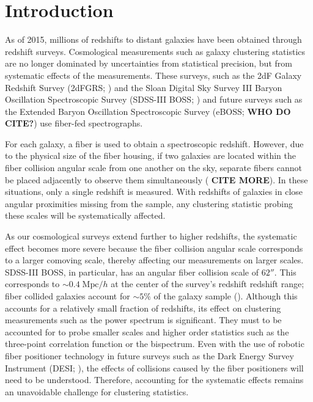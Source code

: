 \documentclass{emulateapj}
\begin{document}
\section{Introduction} 
As of 2015, millions of redshifts to distant galaxies have been obtained through redshift surveys. Cosmological measurements such as galaxy clustering statistics are no longer dominated by uncertainties from statistical precision, but from systematic effects of the measurements. These surveys, such as the 2dF Galaxy Redshift Survey (2dFGRS; \citealt{Colless:1999aa}) and the Sloan Digital Sky Survey III Baryon Oscillation Spectroscopic Survey (SDSS-III BOSS; \citealt{Anderson:2012aa, Dawson:2013aa}) and future surveys such as the Extended Baryon Oscillation Spectroscopic Survey (eBOSS; {\bf WHO DO CITE?}) use fiber-fed spectrographs. 

For each galaxy, a fiber is used to obtain a spectroscopic redshift. However, due to the physical size of the fiber housing, if two galaxies are located within the fiber collision angular scale from one another on the sky, separate fibers cannot be placed adjacently to observe them simultaneously (\citealt{Yoon:2008aa} {\bf CITE MORE}). In these situations, only a single redshift is measured. With redshifts of galaxies in close angular proximities missing from the sample, any clustering statistic probing these scales will be systematically affected. 

As our cosmological surveys extend further to higher redshifts, the systematic effect becomes more severe because the fiber collision angular scale corresponds to a larger comoving scale, thereby affecting our measurements on larger scales. SDSS-III BOSS, in particular, has an angular fiber collision scale of $62''$. This corresponds to $\sim 0.4 \;\mathrm{Mpc}/h$ at the center of the survey's redshift redshift range; fiber collided galaxies account for $\sim 5\%$ of the galaxy sample (\citealt{Anderson:2012aa}). Although this accounts for a relatively small fraction of redshifts, its effect on clustering measurements such as the power spectrum is significant. They must to be accounted for to probe smaller scales and higher order statistics such as the three-point correlation function or the bispectrum. Even with the use of robotic fiber positioner technology in future surveys such as the Dark Energy Survey Instrument (DESI; \citealt{Schlegel:2011aa, Morales:2012aa, Makarem:2014aa}), the effects of collisions caused by the fiber positioners will need to be understood. Therefore, accounting for the systematic effects remains an unavoidable challenge for clustering statistics. 
\end{document}
